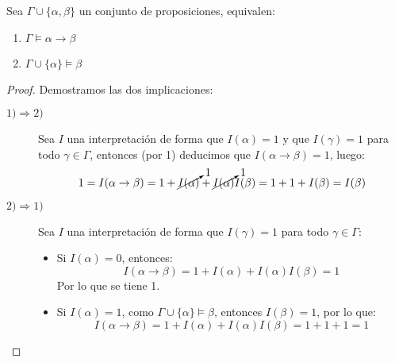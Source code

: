 \begin{teo}[de la deducción]\label{teo:deduccion}
    Sea $\Gamma\cup\{\alpha,\beta\}$ un conjunto de proposiciones, equivalen:
    \begin{enumerate}
        \item $\Gamma\vDash\alpha\to\beta$
        \item $\Gamma\cup\{\alpha\}\vDash\beta$
    \end{enumerate}
    \begin{proof}
        Demostramos las dos implicaciones:
        \begin{description}
            \item [$1)\Longrightarrow 2)$] 
                Sea $I$ una interpretación de forma que $I(\alpha)=1$ y que $I(\gamma)=1$ para todo $\gamma\in \Gamma$, entonces (por 1) deducimos que $I(\alpha\to\beta)=1$, luego:
                \begin{equation*}
                    1 = I(\alpha\to\beta) = 1 + \cancelto{1}{I(\alpha)} + \cancelto{1}{I(\alpha)}I(\beta) = 1 + 1 + I(\beta) = I(\beta)
                \end{equation*}
            \item [$2)\Longrightarrow 1)$] 
                Sea $I$ una interpretación de forma que $I(\gamma)=1$ para todo $\gamma\in \Gamma$: 
                \begin{itemize}
                    \item Si $I(\alpha)=0$, entonces:
                        \begin{equation*}
                            I(\alpha\to\beta) = 1 + I(\alpha) + I(\alpha)I(\beta) = 1
                        \end{equation*}
                        Por lo que se tiene 1.
                    \item Si $I(\alpha)=1$, como $\Gamma\cup\{\alpha\}\vDash\beta$, entonces $I(\beta)=1$, por lo que:
                        \begin{equation*}
                            I(\alpha\to\beta) = 1 + I(\alpha) + I(\alpha)I(\beta) = 1 + 1 + 1 = 1
                        \end{equation*}
                \end{itemize}
        \end{description}
    \end{proof}
\end{teo}

